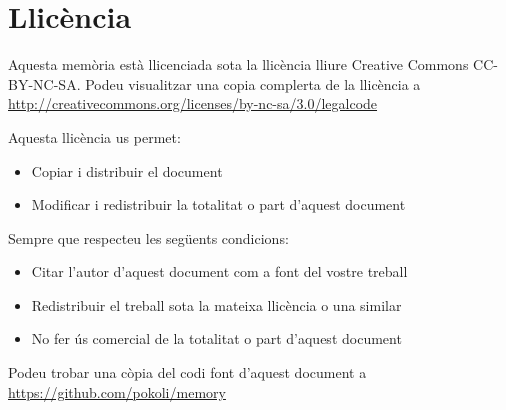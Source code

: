 \chapter*{Llicència}

Aquesta memòria està llicenciada sota la llicència lliure Creative Commons CC-BY-NC-SA. Podeu visualitzar una copia complerta de la llicència a \url{http://creativecommons.org/licenses/by-nc-sa/3.0/legalcode}

Aquesta llicència us permet: 

\begin{itemize}
    \item{Copiar i distribuir el document}
    \item{Modificar i redistribuir la totalitat o part d'aquest document} 
\end{itemize}

Sempre que respecteu les següents condicions: 

\begin{itemize}
    \item{Citar l'autor d'aquest document com a font del vostre treball}
    \item{Redistribuir el treball sota la mateixa llicència o una similar}
    \item{No fer ús comercial de la totalitat o part d'aquest document}
\end{itemize}

Podeu trobar una còpia del codi font d'aquest document a \url{https://github.com/pokoli/memory}

